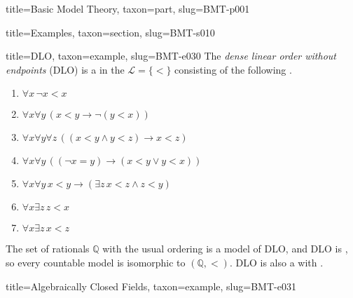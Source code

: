 \documentclass[a4paper]{article}
\begin{document}
\begin{tree}{title={Basic Model Theory}, taxon={part}, slug={BMT-p001}}
\begin{tree}{title={Examples}, taxon={section}, slug={BMT-s010}}
\begin{tree}{title={DLO}, taxon={example}, slug={BMT-e030}}
    The \emph{dense linear order without endpoints} (DLO) is a  in the  \(\mathcal  L= \{ < \}\)
    consisting of the following .
    \begin{enumerate}
\item{\(\forall  x \, \neg  x<x\)}
        \item{\(\forall  x \forall  y \, (x<y \rightarrow \neg (y<x))\)}
        \item{\(\forall  x \forall  y \forall  z \, ((x<y \land  y<z) \rightarrow  x<z)\)}
        \item{\(\forall  x \forall  y \, (( \neg  x=y) \rightarrow (x<y \lor  y<x))\)}
        \item{\(\forall  x \forall  y \, x<y \rightarrow ( \exists  z \, x<z \land  z<y)\)}
        \item{\(\forall  x \exists  z \, z<x\)}
        \item{\(\forall  x \exists  z \, x<z\)}
\end{enumerate}\par{
    The set of rationals \(\mathbb  Q\) with the usual ordering is a model of DLO, and DLO is ,
    so every countable model is isomorphic to \(( \mathbb  Q,<)\). DLO is also a  with
    .
}
\end{tree}

\begin{tree}{title={Algebraically Closed Fields}, taxon={example}, slug={BMT-e031}}


\end{tree}
\end{tree}
\end{tree}
\end{document}
